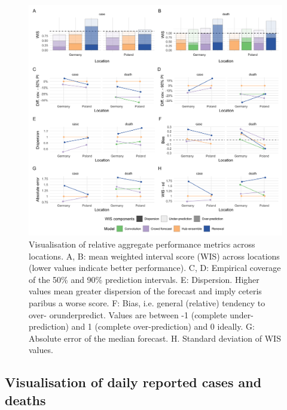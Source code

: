 \documentclass[10pt,letterpaper]{article}
\begin{document}
\begin{figure}[H]
\includegraphics[width=1\linewidth,]{../analysis/plots/aggregate-performance-2-weeks-locations-all-rel-v4} \caption{Visualisation of relative aggregate performance metrics across locations. A, B: mean weighted interval score (WIS) across locations (lower values indicate better performance). C, D: Empirical coverage of the 50\% and 90\% prediction intervals. E: Dispersion. Higher values mean greater dispersion of the forecast and imply ceteris paribus a worse score. F: Bias, i.e. general (relative) tendency to over- orunderpredict. Values are between -1 (complete under-prediction) and 1 (complete over-prediction) and 0 ideally. G: Absolute error of the median forecast. H. Standard deviation of WIS values.}\label{fig:performance-locations-rel}
\end{figure}

\clearpage

\hypertarget{visualisation-of-daily-reported-cases-and-deaths}{%
\subsection{Visualisation of daily reported cases and
deaths}\label{visualisation-of-daily-reported-cases-and-deaths}}
\end{document}
